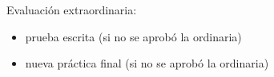 \documentclass[a4paper,12pt]{report}
\begin{document}
Evaluación extraordinaria:

\begin{itemize}
\item prueba escrita (si no se aprobó la ordinaria)
\item nueva práctica final (si no se aprobó la ordinaria)
\end{itemize}










\end{document}
